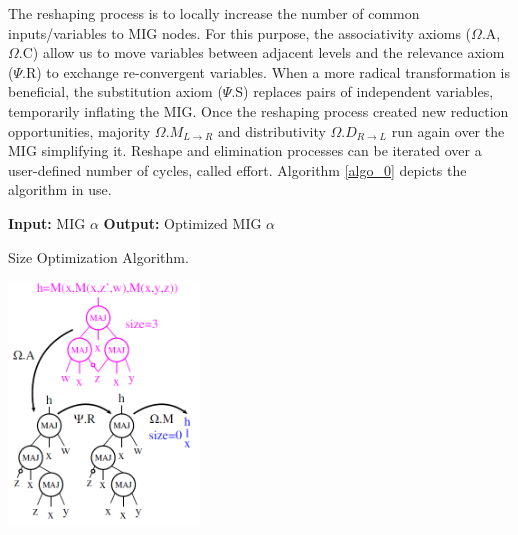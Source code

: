 \documentclass[
	accentcolor=1c,%
	type=intern,
	marginpar=false,
	ruledheaders=section,
	class=report,
	BCOR=5mm,
      parskip=half-,
	fontsize=10pt
	]{tudapub}
\begin{document}
	The reshaping process is to locally increase the number of common inputs/variables to MIG nodes. For this purpose, the associativity axioms ($\Omega$.A, $\Omega$.C) allow us to move variables between adjacent levels and the relevance axiom ($\Psi$.R) to exchange re-convergent variables. When a more radical transformation is beneficial, the substitution axiom ($\Psi$.S) replaces pairs of independent variables, temporarily inflating the MIG. Once the reshaping process created new reduction opportunities, majority $\Omega.M_{L\rightarrow R}$ and distributivity $\Omega.D_{R\rightarrow L}$ run again over the MIG simplifying it. Reshape and elimination processes can be iterated over a user-defined number of cycles, called effort.
	Algorithm \ref{algo_0} depicts the algorithm in use.\newline

\begin{center}
	\begin{algorithm}[H]
		\SetAlgoLined
		\textbf{Input:} MIG $\alpha$\;
		\textbf{Output:} Optimized MIG $\alpha$\;
		\caption{Size Optimization Algorithm.}
		\label{algo_0}
	\end{algorithm}
	\end{center}

	\begin{center}
			\includegraphics [width=2in]{example_size.png}
			\end{center}
	
\end{document}
